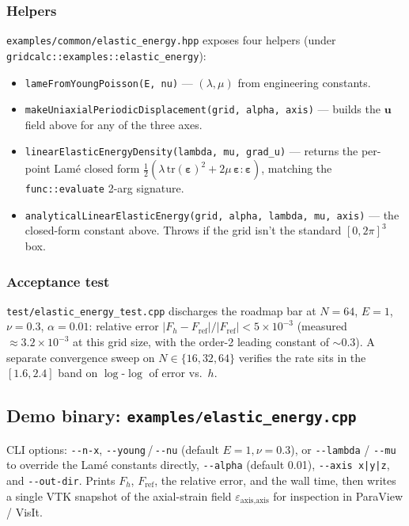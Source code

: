 \subsubsection{Helpers}

\passthrough{\lstinline!examples/common/elastic_energy.hpp!} exposes
four helpers (under
\passthrough{\lstinline!gridcalc::examples::elastic_energy!}):

\begin{itemize}
\tightlist
\item
  \passthrough{\lstinline!lameFromYoungPoisson(E, nu)!} ---
  \((\lambda, \mu)\) from engineering constants.
\item
  \passthrough{\lstinline!makeUniaxialPeriodicDisplacement(grid, alpha, axis)!}
  --- builds the \(\mathbf u\) field above for any of the three axes.
\item
  \passthrough{\lstinline!linearElasticEnergyDensity(lambda, mu, grad_u)!}
  --- returns the per-point Lamé closed form
  \(\tfrac12(\lambda\,\mathrm{tr}(\boldsymbol\varepsilon)^2
  + 2\mu\,\boldsymbol\varepsilon:\boldsymbol\varepsilon)\), matching
  the \passthrough{\lstinline!func::evaluate!} 2-arg signature.
\item
  \passthrough{\lstinline!analyticalLinearElasticEnergy(grid, alpha, lambda, mu, axis)!}
  --- the closed-form constant above. Throws if the grid isn't the
  standard \([0, 2\pi]^3\) box.
\end{itemize}

\subsubsection{Acceptance test}

\passthrough{\lstinline!test/elastic_energy_test.cpp!}
discharges the roadmap bar at \(N = 64\),
\(E = 1\),
\(\nu = 0.3\),
\(\alpha = 0.01\): relative error
\(|F_h - F_{\mathrm{ref}}| / |F_{\mathrm{ref}}| < 5\times 10^{-3}\)
(measured \(\approx 3.2\times 10^{-3}\) at this grid size, with the
order-2 leading constant of \(\sim 0.3\)). A separate
convergence sweep on \(N \in \{16, 32, 64\}\) verifies the rate sits
in the \([1.6, 2.4]\) band on \(\log\)-\(\log\) of error vs.\ \(h\).

\subsection{Demo binary: \texttt{examples/elastic\_energy.cpp}}\label{phase15-demo}

CLI options: \passthrough{\lstinline!--n-x!},
\passthrough{\lstinline!--young!}\,/\,\passthrough{\lstinline!--nu!}
(default \(E=1, \nu=0.3\)), or \passthrough{\lstinline!--lambda!} /
\passthrough{\lstinline!--mu!} to override the Lamé constants
directly, \passthrough{\lstinline!--alpha!} (default 0.01),
\passthrough{\lstinline!--axis x|y|z!}, and
\passthrough{\lstinline!--out-dir!}. Prints \(F_h\), \(F_{\mathrm{ref}}\),
the relative error, and the wall time, then writes a single VTK
snapshot of the axial-strain field
\(\varepsilon_{\text{axis,axis}}\) for inspection in ParaView / VisIt.

